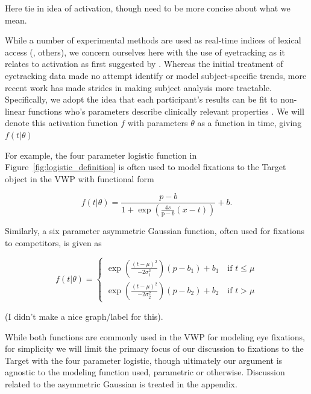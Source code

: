 Here tie in idea of activation, though need to be more concise about what we mean. 

While a number of experimental methods are used as real-time indices of lexical access (\cite{Spivey2005}, others), we concern ourselves here with the use of eyetracking as it relates to activation as first suggested by \cite{allopenna1998tracking}. Whereas the initial treatment of eyetracking data made no attempt identify or model subject-specific trends, more recent work has made strides in making subject analysis more tractable. Specifically, we adopt the idea that each participant's results can be fit to non-linear functions who's parameters describe clinically relevant properties \cite{mcmurray2010individual}. We will denote this activation function $f$ with parameters $\theta$ as a function in time, giving $f(t|\theta)$

For example, the four parameter logistic function in Figure~\ref{fig:logistic_definition} is often used to model fixations to the Target object in the VWP with functional form

\begin{equation} \label{eq:logistic}
f(t|\theta) = \frac{p-b}{1 + \exp \left(\frac{4s}{\text{p}-b} (x - t) \right)} + b.
\end{equation}

Similarly, a six parameter asymmetric Gaussian function, often used for fixations to competitors, is given as

\begin{equation} \label{eq:dg}
f(t|\theta) = \begin{cases}
\exp \left( \frac{(t - \mu)^2}{-2\sigma_1^2} \right) (p - b_1) + b_1 \quad \text{if } t \leq \mu \\
\exp \left( \frac{(t - \mu)^2}{-2\sigma_2^2} \right) (p - b_2) + b_2 \quad \text{if } t > \mu
\end{cases}
\end{equation}

(I didn't make a nice graph/label for this). 

While both functions are commonly used in the VWP for modeling eye fixations, for simplicity we will limit the primary focus of our discussion to fixations to the Target with the four parameter logistic, though ultimately our argument is agnostic to the modeling function used, parametric or otherwise. Discussion related to the asymmetric Gaussian is treated in the appendix.


